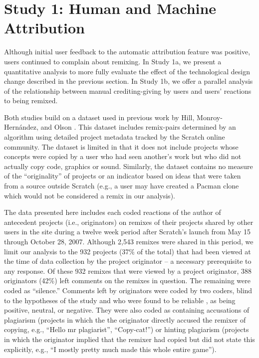 \section{Study 1: Human and Machine Attribution}

Although initial user feedback to the automatic attribution feature
was positive, users continued to complain about remixing.  In Study
1a, we present a quantitative analysis to more fully evaluate the
effect of the technological design change described in the previous
section.  In Study 1b, we offer a parallel analysis of the
relationship between manual crediting-giving by users and users'
reactions to being remixed.

Both studies build on a dataset used in previous work by Hill,
Monroy-Hernández, and Olson \cite{hill_responses_2010}. This dataset
includes remix-pairs determined by an algorithm using detailed project
metadata tracked by the Scratch online community.  The dataset is
limited in that it does not include projects whose concepts were
copied by a user who had seen another’s work but who did not actually
copy code, graphics or sound. Similarly, the dataset contains no
measure of the ``originality'' of projects or an indicator based on
ideas that were taken from a source outside Scratch (e.g., a user may
have created a Pacman clone which would not be considered a remix in
our analysis).

The data presented here includes each coded reactions of the author of
antecedent projects (i.e., originators) on remixes of their projects
shared by other users in the site during a twelve week period after
Scratch's launch from May 15 through October 28, 2007. Although 2,543
remixes were shared in this period, we limit our analysis to the 932
projects (37\% of the total) that had been viewed at the time of data
collection by the project originator -- a necessary prerequisite to
any response. Of these 932 remixes that were viewed by a project
originator, 388 originators (42\%) left comments on the remixes in
question. The remaining were coded as ``silence.''  Comments left by
originators were coded by two coders, blind to the hypotheses of the
study and who were found to be reliable \cite{hill_responses_2010}, as
being positive, neutral, or negative. They were also coded as 
containing accusations of plagiarism (projects in which the the
originator directly accused the remixer of copying, e.g., ``Hello mr
plagiarist'', ``Copy-cat!'')  or hinting plagiarism (projects in which
the originator implied that the remixer had copied but did not state
this explicitly, e.g., ``I mostly pretty much made this whole entire
game'').

